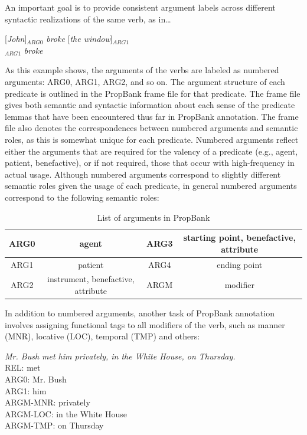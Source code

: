 \documentclass[11pt]{report}
\begin{document}
\noindent An important goal is to provide consistent argument labels across different syntactic realizations of the same verb, as in\ldots

[\textit{John}]$_{ARG0}$ \textit{broke} [\textit{the window}]$_{ARG1}$ \\ $_{ARG1}$ \textit{broke}

\noindent As this example shows, the arguments of the verbs are labeled as numbered arguments: ARG0, ARG1, ARG2, and so on.  The argument structure of each predicate is outlined in the PropBank frame file for that predicate.  The frame file gives both semantic and syntactic information about each sense of the predicate lemmas that have been encountered thus far in PropBank annotation.  The frame file also denotes the correspondences between numbered arguments and semantic roles, as this is somewhat unique for each predicate.  Numbered arguments reflect either the arguments that are required for the valency of a predicate (e.g., agent, patient, benefactive), or if not required, those that occur with high-frequency in actual usage.  Although numbered arguments correspond to slightly different semantic roles given the usage of each predicate, in general numbered arguments correspond to the following semantic roles: 

\begin{table}[htp]
\centering
\begin{tabular}{|c|c||c|c|}
\hline ARG0 & agent   & ARG3 & starting point, benefactive, attribute\\
\hline ARG1 & patient & ARG4 & ending point\\
\hline ARG2 & instrument, benefactive, attribute & ARGM & modifier\\
\hline 
\end{tabular}
\caption{List of arguments in PropBank}
\label{tbl:arguments}
\end{table}

\noindent In addition to numbered arguments, another task of PropBank annotation involves assigning functional tags to all modifiers of the verb, such as manner (MNR), locative (LOC), temporal (TMP) and others:

\textit{Mr. Bush met him privately, in the White House, on Thursday.} \\
REL:  met \\
ARG0: Mr. Bush \\ 
ARG1: him \\
ARGM-MNR: privately \\
ARGM-LOC: in the White House \\
ARGM-TMP: on Thursday
\end{document}
